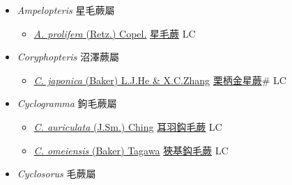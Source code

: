 
  \begin{itemize}
 \item[] \textit{Ampelopteris} 星毛蕨屬
                    
  \begin{itemize}
        \item[] \href{http://www.theplantlist.org/tpl1.1/search?q=Ampelopteris+prolifera}{\textit{A. prolifera} (Retz.) Copel.}   \href{\detokenize{http://taibnet.sinica.edu.tw/chi/taibnet_species_list.php?T2=星毛蕨&T2_new_value=true&fr=y}}{星毛蕨} LC
  \end{itemize}
 \item[] \textit{Coryphopteris} 沼澤蕨屬
                    
  \begin{itemize}
        \item[] \href{http://www.theplantlist.org/tpl1.1/search?q=Coryphopteris+japonica}{\textit{C. japonica} (Baker) L.J.He \& X.C.Zhang}     \href{\detokenize{http://taibnet.sinica.edu.tw/chi/taibnet_species_list.php?T2=栗柄金星蕨&T2_new_value=true&fr=y}}{栗柄金星蕨}\# LC
  \end{itemize}
 \item[] \textit{Cyclogramma} 鉤毛蕨屬
                    
  \begin{itemize}
        \item[] \href{http://www.theplantlist.org/tpl1.1/search?q=Cyclogramma+auriculata}{\textit{C. auriculata} (J.Sm.) Ching}     \href{\detokenize{http://taibnet.sinica.edu.tw/chi/taibnet_species_list.php?T2=耳羽鈎毛蕨&T2_new_value=true&fr=y}}{耳羽鈎毛蕨} LC
        \item[] \href{http://www.theplantlist.org/tpl1.1/search?q=Cyclogramma+omeiensis}{\textit{C. omeiensis} (Baker) Tagawa}     \href{\detokenize{http://taibnet.sinica.edu.tw/chi/taibnet_species_list.php?T2=狹基鈎毛蕨&T2_new_value=true&fr=y}}{狹基鈎毛蕨} LC
  \end{itemize}
 \item[] \textit{Cyclosorus} 毛蕨屬
                    

\end{itemize}
